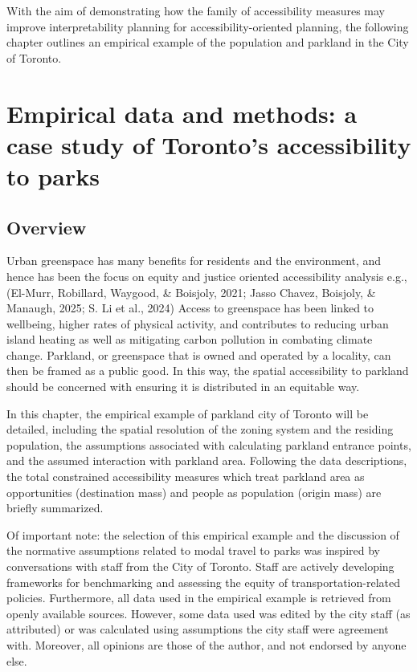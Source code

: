 \documentclass[
11pt, %
oneside, %
english, %
singlespacing, %
]{macthesis} %
\begin{document}
With the aim of demonstrating how the family of accessibility measures may improve interpretability planning for accessibility-oriented planning, the following chapter outlines an empirical example of the population and parkland in the City of Toronto.

\chapter{Empirical data and methods: a case study of Toronto's accessibility to parks}\label{empirical-data-and-methods-a-case-study-of-torontos-accessibility-to-parks}

\section{Overview}\label{overview-2}

Urban greenspace has many benefits for residents and the environment, and hence has been the focus on equity and justice oriented accessibility analysis e.g., (El-Murr, Robillard, Waygood, \& Boisjoly, 2021; Jasso Chavez, Boisjoly, \& Manaugh, 2025; S. Li et al., 2024) Access to greenspace has been linked to wellbeing, higher rates of physical activity, and contributes to reducing urban island heating as well as mitigating carbon pollution in combating climate change. Parkland, or greenspace that is owned and operated by a locality, can then be framed as a public good. In this way, the spatial accessibility to parkland should be concerned with ensuring it is distributed in an equitable way.

In this chapter, the empirical example of parkland city of Toronto will be detailed, including the spatial resolution of the zoning system and the residing population, the assumptions associated with calculating parkland entrance points, and the assumed interaction with parkland area. Following the data descriptions, the total constrained accessibility measures which treat parkland area as opportunities (destination mass) and people as population (origin mass) are briefly summarized.

Of important note: the selection of this empirical example and the discussion of the normative assumptions related to modal travel to parks was inspired by conversations with staff from the City of Toronto. Staff are actively developing frameworks for benchmarking and assessing the equity of transportation-related policies. Furthermore, all data used in the empirical example is retrieved from openly available sources. However, some data used was edited by the city staff (as attributed) or was calculated using assumptions the city staff were agreement with. Moreover, all opinions are those of the author, and not endorsed by anyone else.
\end{document}
